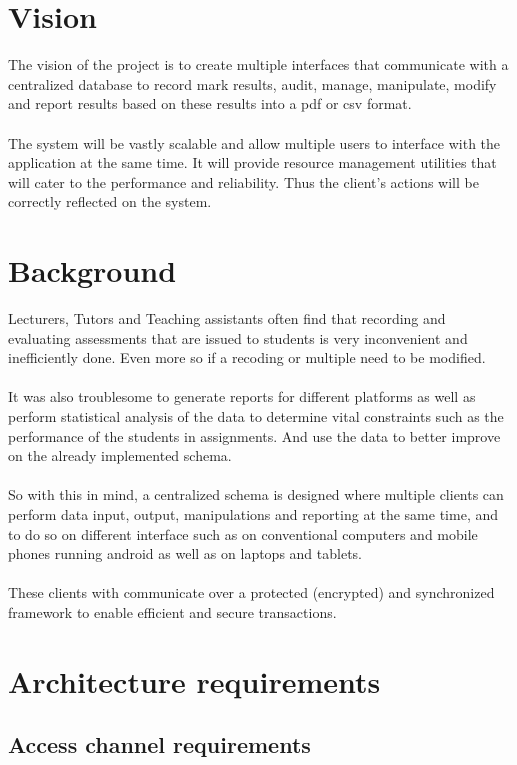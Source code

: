\documentclass[10pt,a4paper]{article}
\begin{document}
\section{Vision}
The vision of the project is to create multiple interfaces that communicate with a centralized database to record mark results, audit, manage, manipulate, modify and report results based on these results into a pdf or csv format.\\\\The system will be vastly scalable and allow multiple users to interface with the application at the same time. It will provide resource management utilities that will cater to the performance and reliability. Thus the client’s actions will be correctly reflected on the system.

\section{Background}
Lecturers, Tutors and Teaching assistants often find that recording and evaluating assessments that are issued to students is very inconvenient and inefficiently done. Even more so if a recoding or multiple need to be modified.\\\\
It was also troublesome to generate reports for different platforms as well as perform statistical analysis of the data to determine vital constraints such as the performance of the students in assignments. And use the data to better improve on the already implemented schema.\\\\
So with this in mind, a centralized schema is designed where multiple clients can perform data input, output, manipulations and reporting at the same time, and to do so on different interface such as on conventional computers and mobile phones running android as well as on laptops and tablets.\\\\These clients with communicate over a protected (encrypted) and synchronized framework to enable efficient and secure transactions. 


\section{Architecture requirements}
\subsection{Access channel requirements}
	
\end{document}
